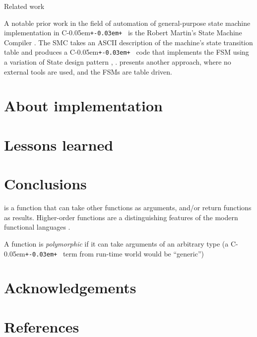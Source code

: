 \documentclass{kapproc}
\newcommand{\Cpp}{C\kern-0.05em\texttt{+\kern-0.03em+}%
}
\begin{document}
Related work

A notable prior work in the field of automation of general-purpose 
state machine implementation in \Cpp\ is the Robert Martin's State 
Machine Compiler \cite{SMC}. The SMC takes an ASCII description of the 
machine's state transition table and produces a \Cpp\ code that 
implements the FSM using a variation of State design pattern \cite{Hun91},
\cite{GHJ+95}. \cite{Laf00} presents another approach, where no external tools 
are used, and the FSMs are table driven. 


\section{About implementation}

\section{Lessons learned}

\section{Conclusions}

\begin{glossary}
   is a function that can take other
  functions as arguments, and/or return functions as
  results. Higher-order functions are a distinguishing features of the
  modern functional languages \cite{Hud79}.

   A function is \emph{polymorphic} if it can take
  arguments of an arbitrary type (a \Cpp\ term from run-time world
  would be ``generic'')
\end{glossary}


\section{Acknowledgements}
\section{References}


\end{document}
